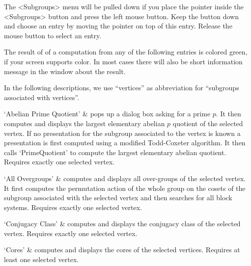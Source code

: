%
%
%


The <Subgroups> menu will be pulled down  if you place the pointer inside
the <Subgroups> button and press the  left mouse button.  Keep the button
down and  choose an entry by  moving  the pointer on   top of this entry.
Release the mouse button to select an entry.

The result of  of  a computation  from any  of  the following entries  is
colored green, if  your screen supports color.   In most cases there will
also be short information message in the {\GAP} window about the result.

In  the following descriptions, we  use ``vertices'' as abbreviation for
``subgroups associated with vertices''.

\beginitems
`Abelian Prime Quotient' &
pops  up a dialog  box asking  for a  prime  $p$.  It  then computes  and
displays the largest elementary   abelian  $p$ quotient of  the  selected
vertex.  If no presentation for the  subgroup associated to the vertex is
known   a presentation is  first computed  using  a modified Todd-Coxeter
algorithm.     It then calls    `PrimeQuotient' to   compute  the largest
elementary abelian quotient.  Requires exactly one selected vertex.

`All Overgroups' &
computes and displays all over-groups  of the selected vertex.  It  first
computes the permutation action of the whole  group on the cosets of the
subgroup associated with  the selected vertex and  then searches  for all
block systems.  Requires exactly one selected vertex.

`Conjugacy Class' &
computes and  displays  the   conjugacy  class of  the   selected vertex.
Requires  exactly  one selected vertex.  

`Cores' &
computes and  displays the cores  of the selected vertices.   Requires at
least one selected vertex.

